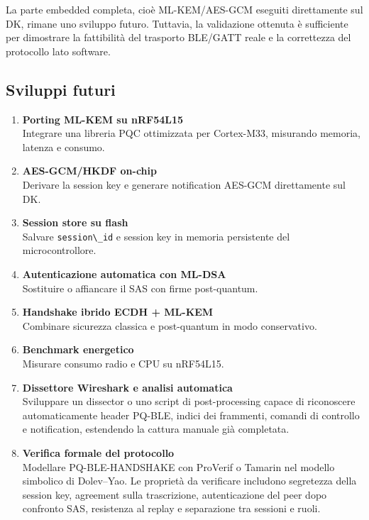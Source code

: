\documentclass[11pt,a4paper]{article}
\newcommand{\passthrough}[1]{#1}
\begin{document}
La parte embedded completa, cioè ML-KEM/AES-GCM eseguiti direttamente
sul DK, rimane uno sviluppo futuro. Tuttavia, la validazione ottenuta è
sufficiente per dimostrare la fattibilità del trasporto BLE/GATT reale e
la correttezza del protocollo lato software.

\subsection{Sviluppi futuri}\label{sviluppi-futuri}

\begin{enumerate}
\def\labelenumi{\arabic{enumi}.}
\item
  \textbf{Porting ML-KEM su nRF54L15}\\
  Integrare una libreria PQC ottimizzata per Cortex-M33, misurando
  memoria, latenza e consumo.
\item
  \textbf{AES-GCM/HKDF on-chip}\\
  Derivare la session key e generare notification AES-GCM direttamente
  sul DK.
\item
  \textbf{Session store su flash}\\
  Salvare \passthrough{\lstinline!session\_id!} e session key in memoria
  persistente del microcontrollore.
\item
  \textbf{Autenticazione automatica con ML-DSA}\\
  Sostituire o affiancare il SAS con firme post-quantum.
\item
  \textbf{Handshake ibrido ECDH + ML-KEM}\\
  Combinare sicurezza classica e post-quantum in modo conservativo.
\item
  \textbf{Benchmark energetico}\\
  Misurare consumo radio e CPU su nRF54L15.
\item
  \textbf{Dissettore Wireshark e analisi automatica}\\
  Sviluppare un dissector o uno script di post-processing capace di riconoscere automaticamente header PQ-BLE, indici dei frammenti, comandi di controllo e notification, estendendo la cattura manuale già completata.
\item
  \textbf{Verifica formale del protocollo}\\
  Modellare PQ-BLE-HANDSHAKE con ProVerif o Tamarin nel modello simbolico
  di Dolev--Yao. Le proprietà da verificare includono segretezza della
  session key, agreement sulla trascrizione, autenticazione del peer dopo
  confronto SAS, resistenza al replay e separazione tra sessioni e ruoli.
\end{enumerate}
\end{document}
